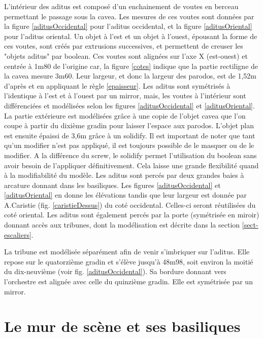 L'intérieur des \gls{aditus} est composé d'un enchainement de voutes en berceau permettant le passage sous la \gls{cavea}. Les mesures de ces voutes sont données par la figure \ref{aditusOccidental} pour l'\gls{aditus} occidental, et la figure \ref{aditusOriental} pour l'\gls{aditus} oriental. Un objet à l'est et un objet à l'ouest, épousant la forme de ces voutes, sont créés par extrusions successives, et permettent de creuser les "objets aditus" par \gls{boolean}. Ces voutes sont alignées sur l'axe X (est-ouest) et centrée à 1m80 de l'origine car, la figure \ref{cotes} indique que la partie rectiligne de la \gls{cavea} mesure 3m60. Leur largeur, et donc la largeur des \gls{parodos}, est de 1,52m d'après \cite[Pl. XXI]{orangePl} et en appliquant le règle \ref{epaisseur}. Les \gls{aditus} sont symétrisés à l'identique à l'est et à l'ouest par un \gls{mirror}, mais, les voutes à l'intérieur sont différenciées et modélisées selon les figures \ref{aditusOccidental} et \ref{aditusOriental}. La partie extérieure est modélisées grâce à une copie de l'objet \gls{cavea} que l'on coupe à partir du dixième gradin pour laisser l'espace aux \gls{parodos}. L'objet plan est ensuite épaissi de 3,6m grâce à un \gls{solidify}. Il est important de noter que tant qu'un \gls{modifier} n'est pas appliqué, il est toujours possible de le masquer ou de le modifier. A la différence du \gls{screw}, le \gls{solidify} permet l'utilisation du \gls{boolean} sans avoir besoin de l'appliquer définitivement. Cela laisse une grande flexibilité quand à la modifiabilité du modèle. Les \gls{aditus} sont percés par deux grandes baies à arcature donnant dans les basiliques. Les figures \ref{aditusOccidental} et \ref{aditusOriental} en donne les élévations tandis que leur largeur est donnée par A.Caristie (fig. \ref{caristieDessus}) du coté occidental. Celles-ci seront réutilisées du coté oriental. Les \gls{aditus} sont également percés par la porte (symétrisée en miroir) donnant accès aux tribunes, dont la modélisation est décrite dans la section \ref{sect-escaliers}.

La tribune est modélisée séparément afin de venir s'imbriquer sur l'\gls{aditus}. Elle repose sur le quatorzième gradin et s'élève jusqu'à 48m98, soit environ la moitié du dix-neuvième (voir fig. \ref{aditusOccidental}). Sa bordure donnant vers l'orchestre est alignée avec celle du quinzième gradin. Elle est symétrisée par un \gls{mirror}.

\section{Le mur de scène et ses \glspl{basilique}} 
\label{mur}


